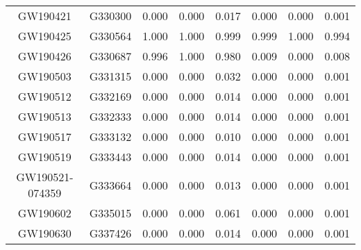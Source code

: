 \begin{table}[]
\begin{tabular}{c|c|ccr|ccr}
GW190421                      & G330300               & 0.000                   & 0.000                    & 0.017                   & 0.000                   & 0.000                    & 0.001                   \\
GW190425                      & G330564               & 1.000                   & 1.000                    & 0.999                   & 0.999                   & 1.000                    & 0.994                   \\
GW190426                      & G330687               & 0.996                   & 1.000                    & 0.980                   & 0.009                   & 0.000                    & 0.008                   \\
GW190503                      & G331315               & 0.000                   & 0.000                    & 0.032                   & 0.000                   & 0.000                    & 0.001                   \\
GW190512                      & G332169               & 0.000                   & 0.000                    & 0.014                   & 0.000                   & 0.000                    & 0.001                   \\
GW190513                      & G332333               & 0.000                   & 0.000                    & 0.014                   & 0.000                   & 0.000                    & 0.001                   \\
GW190517                      & G333132               & 0.000                   & 0.000                    & 0.010                   & 0.000                   & 0.000                    & 0.001                   \\
GW190519                      & G333443               & 0.000                   & 0.000                    & 0.014                   & 0.000                   & 0.000                    & 0.001                   \\
GW190521-074359               & G333664               & 0.000                   & 0.000                    & 0.013                   & 0.000                   & 0.000                    & 0.001                   \\
GW190602                      & G335015               & 0.000                   & 0.000                    & 0.061                   & 0.000                   & 0.000                    & 0.001                   \\
GW190630                      & G337426               & 0.000                   & 0.000                    & 0.014                   & 0.000                   & 0.000                    & 0.001                   \\

\end{tabular}
\end{table}
